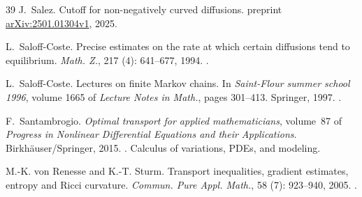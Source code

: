 \documentclass[10pt,reqno]{amsart}
\numberwithin{equation}{section}
\begin{document}
\begin{thebibliography}{39}
J.~Salez.
\newblock Cutoff for non-negatively curved diffusions.
\newblock preprint
  \href{https://arXiv.org/abs/2501.01304v1}{arXiv:2501.01304v1}, 2025.

L.~Saloff-Coste.
\newblock Precise estimates on the rate at which certain diffusions tend to
  equilibrium.
\newblock \emph{Math. Z.}, 217 (4): 641--677, 1994.
\newblock {}.

L.~Saloff-Coste.
\newblock Lectures on finite {M}arkov chains.
\newblock In \emph{{S}aint-{F}lour summer school 1996}, volume 1665 of
  \emph{Lecture Notes in Math.}, pages 301--413. Springer, 1997.
\newblock {}.

F.~Santambrogio.
\newblock \emph{Optimal transport for applied mathematicians}, volume~87 of
  \emph{Progress in Nonlinear Differential Equations and their Applications}.
\newblock Birkh\"auser/Springer, 2015.
\newblock {}.
\newblock Calculus of variations, PDEs, and modeling.

M.-K. von Renesse and K.-T. Sturm.
\newblock Transport inequalities, gradient estimates, entropy and {Ricci}
  curvature.
\newblock \emph{Commun. Pure Appl. Math.}, 58 (7): 923--940,
  2005.
\newblock {}.

\end{thebibliography}
\end{document}
